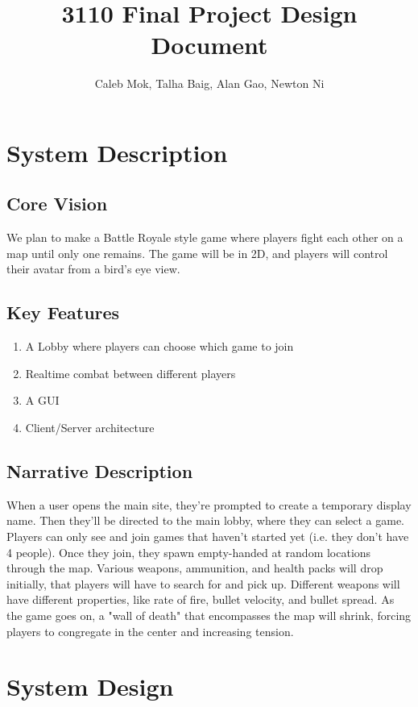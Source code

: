 \documentclass{article}
\author{Caleb Mok, Talha Baig, Alan Gao, Newton Ni}
\title{3110 Final Project Design Document}
\begin{document}
\maketitle

    \section{System Description}

        \subsection{Core Vision}
        We plan to make a Battle Royale style game where players fight each other on a map until only one remains. The game will be in 2D, and players will control their avatar from a bird's eye view.

        \subsection{Key Features}
        \begin{enumerate}
             \item A Lobby where players can choose which game to join
             \item Realtime combat between different players
             \item A GUI
             \item Client/Server architecture
	\end{enumerate}
	
        \subsection{Narrative Description}
	When a user opens the main site, they're prompted to create a temporary display name. Then they'll be directed to the main lobby, where they can select a game. Players can only see and join games that haven't started yet (i.e. they don't have 4 people). Once they join, they spawn empty-handed at random locations through the map. Various weapons, ammunition, and health packs will drop initially, that players will have to search for and pick up. Different weapons will have different properties, like rate of fire, bullet velocity, and bullet spread. As the game goes on, a "wall of death" that encompasses the map will shrink, forcing players to congregate in the center and increasing tension.

    \section{System Design}
\end{document}

